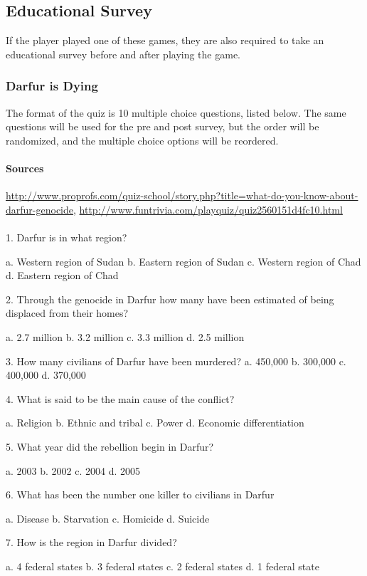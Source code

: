 \subsection{Educational Survey}
	If the player played one of these games, they are also required to take an educational survey before and after playing the game.
	\subsubsection{Darfur is Dying}
		The format of the quiz is 10 multiple choice questions, listed below. The same questions will be used for the pre and post survey, but the order will be randomized, and the multiple choice options will be reordered.
		\paragraph{Sources} \url{http://www.proprofs.com/quiz-school/story.php?title=what-do-you-know-about-darfur-genocide}, \url{http://www.funtrivia.com/playquiz/quiz2560151d4fc10.html}
		\paragraph{}	 1. Darfur is in what region?

a. Western region of Sudan
b. Eastern region of Sudan
c. Western region of Chad
d. Eastern region of Chad

2. Through the genocide in Darfur how many have been estimated of being displaced from their homes?

a. 2.7 million
b. 3.2 million
c. 3.3 million
d. 2.5 million

3. How many civilians of Darfur have been murdered?
a. 450,000
b. 300,000
c. 400,000
d. 370,000

4. What is said to be the main cause of the conflict?

a. Religion
b. Ethnic and tribal
c. Power
d. Economic differentiation 

5. What year did the rebellion begin in Darfur?

a. 2003
b. 2002
c. 2004
d. 2005

6. What has been the number one killer to civilians in Darfur

a. Disease
b. Starvation
c. Homicide
d. Suicide



7. How is the region in Darfur divided?

a. 4 federal states
b. 3 federal states
c. 2 federal states
d. 1 federal state

